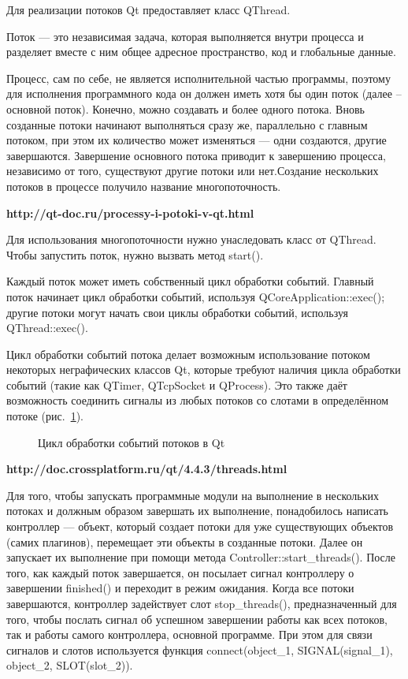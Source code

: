 Для реализации потоков Qt предоставляет класс QThread.

Поток — это независимая задача, которая выполняется внутри процесса и разделяет вместе с ним общее адресное пространство, код и глобальные данные.

Процесс, сам по себе, не является исполнительной частью программы, поэтому для исполнения программного кода он должен иметь хотя бы один поток (далее -- основной поток). Конечно, можно создавать и более одного потока. Вновь созданные потоки начинают выполняться сразу же, параллельно с главным потоком, при этом их количество может изменяться — одни создаются, другие завершаются. Завершение основного потока приводит к завершению процесса, независимо от того, существуют другие потоки или нет.Создание нескольких потоков в процессе получило название многопоточность.

\textbf{http://qt-doc.ru/processy-i-potoki-v-qt.html}

Для использования многопоточности нужно унаследовать класс от QThread. Чтобы запустить поток, нужно вызвать метод start().

Каждый поток может иметь собственный цикл обработки событий. Главный поток начинает цикл обработки событий, используя QCoreApplication::exec(); другие потоки могут начать свои циклы обработки событий, используя QThread::exec().

Цикл обработки событий потока делает возможным использование потоком некоторых неграфических классов Qt, которые требуют наличия цикла обработки событий (такие как QTimer, QTcpSocket и QProcess). Это также даёт возможность соединить сигналы из любых потоков со слотами в определённом потоке (рис.~\ref{thread-cycle:thread-cycle}).

\begin{figure}[h!]
\caption{ Цикл обработки событий потоков в Qt }
\label{thread-cycle:thread-cycle}
\end{figure}

\textbf{http://doc.crossplatform.ru/qt/4.4.3/threads.html}

Для того, чтобы запускать программные модули на выполнение в нескольких потоках и должным образом завершать их выполнение, понадобилось написать контроллер --- объект, который создает потоки для уже существующих объектов (самих плагинов), перемещает эти объекты в созданные потоки. Далее он запускает их выполнение при помощи метода Controller::start\_threads(). После того, как каждый поток завершается, он посылает сигнал контроллеру о завершении finished() и переходит в режим ожидания. Когда все потоки завершаются, контроллер задействует слот stop\_threads(), предназначенный для того, чтобы послать сигнал об успешном завершении работы как всех потоков, так и работы самого контроллера, основной программе. При этом для связи сигналов и слотов используется функция connect(object\_1, SIGNAL(signal\_1), object\_2, SLOT(slot\_2)).  

